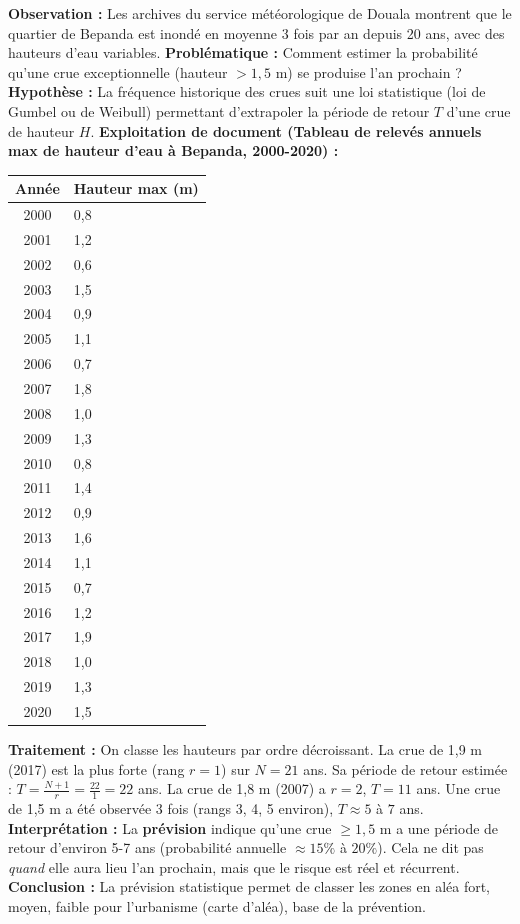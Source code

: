 \documentclass[11pt]{article}
\begin{document}
\begin{experience}
\textbf{Observation :} Les archives du service météorologique de Douala montrent que le quartier de Bepanda est inondé en moyenne 3 fois par an depuis 20 ans, avec des hauteurs d'eau variables.
\textbf{Problématique :} Comment estimer la probabilité qu'une crue exceptionnelle (hauteur $> 1,5$ m) se produise l'an prochain ?
\textbf{Hypothèse :} La fréquence historique des crues suit une loi statistique (loi de Gumbel ou de Weibull) permettant d'extrapoler la période de retour $T$ d'une crue de hauteur $H$.
\textbf{Exploitation de document (Tableau de relevés annuels max de hauteur d'eau à Bepanda, 2000-2020) :}
\begin{center}
\begin{tabularx}{\linewidth}{|c|X|}\hline
\textbf{Année} & \textbf{Hauteur max (m)} \\ \hline
2000 & 0,8 \\ 2001 & 1,2 \\ 2002 & 0,6 \\ 2003 & 1,5 \\ 2004 & 0,9 \\ 2005 & 1,1 \\ 2006 & 0,7 \\ 2007 & 1,8 \\ 2008 & 1,0 \\ 2009 & 1,3 \\ \hline
2010 & 0,8 \\ 2011 & 1,4 \\ 2012 & 0,9 \\ 2013 & 1,6 \\ 2014 & 1,1 \\ 2015 & 0,7 \\ 2016 & 1,2 \\ 2017 & 1,9 \\ 2018 & 1,0 \\ 2019 & 1,3 \\ 2020 & 1,5 \\ \hline
\end{tabularx}
\end{center}
\textbf{Traitement :} On classe les hauteurs par ordre décroissant. La crue de 1,9 m (2017) est la plus forte (rang $r=1$) sur $N=21$ ans. Sa période de retour estimée : $T = \frac{N+1}{r} = \frac{22}{1} = 22$ ans. La crue de 1,8 m (2007) a $r=2$, $T=11$ ans. Une crue de 1,5 m a été observée 3 fois (rangs 3, 4, 5 environ), $T \approx 5$ à $7$ ans.
\textbf{Interprétation :} La \textbf{prévision} indique qu'une crue $\ge 1,5$ m a une période de retour d'environ 5-7 ans (probabilité annuelle $\approx 15\%$ à $20\%$). Cela ne dit pas \emph{quand} elle aura lieu l'an prochain, mais que le risque est réel et récurrent.
\textbf{Conclusion :} La prévision statistique permet de classer les zones en aléa fort, moyen, faible pour l'urbanisme (carte d'aléa), base de la prévention.
\end{experience}
\end{document}
